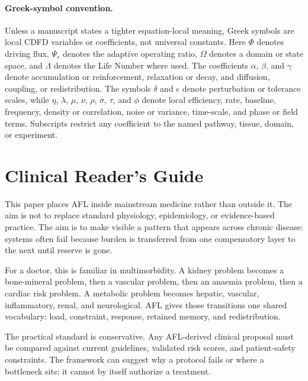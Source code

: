 \documentclass[12pt,a4paper]{article}
\begin{document}
\paragraph{Greek-symbol convention.}
Unless a manuscript states a tighter equation-local meaning, Greek symbols are local CDFD variables or coefficients, not universal constants. Here $\Phi$ denotes driving flux, $\Psi_s$ denotes the adaptive operating ratio, $\Omega$ denotes a domain or state space, and $\Lambda$ denotes the Life Number where used. The coefficients $\alpha$, $\beta$, and $\gamma$ denote accumulation or reinforcement, relaxation or decay, and diffusion, coupling, or redistribution. The symbols $\delta$ and $\epsilon$ denote perturbation or tolerance scales, while $\eta$, $\lambda$, $\mu$, $\nu$, $\rho$, $\sigma$, $\tau$, and $\phi$ denote local efficiency, rate, baseline, frequency, density or correlation, noise or variance, time-scale, and phase or field terms. Subscripts restrict any coefficient to the named pathway, tissue, domain, or experiment.

\section*{Clinical Reader's Guide}
This paper places AFL inside mainstream medicine rather than outside it. The aim is not to replace standard physiology, epidemiology, or evidence-based practice. The aim is to make visible a pattern that appears across chronic disease: systems often fail because burden is transferred from one compensatory layer to the next until reserve is gone.

For a doctor, this is familiar in multimorbidity. A kidney problem becomes a bone-mineral problem, then a vascular problem, then an anaemia problem, then a cardiac risk problem. A metabolic problem becomes hepatic, vascular, inflammatory, renal, and neurological. AFL gives those transitions one shared vocabulary: load, constraint, response, retained memory, and redistribution.

The practical standard is conservative. Any AFL-derived clinical proposal must be compared against current guidelines, validated risk scores, and patient-safety constraints. The framework can suggest why a protocol fails or where a bottleneck sits; it cannot by itself authorize a treatment.


\vspace{0.5em}\noindent{}
\vspace{0.75em}
\end{document}
